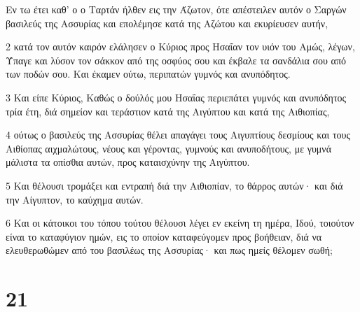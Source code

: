 \par Εν τω έτει καθ' ο ο Ταρτάν ήλθεν εις την Άζωτον, ότε απέστειλεν αυτόν ο Σαργών βασιλεύς της Ασσυρίας και επολέμησε κατά της Αζώτου και εκυρίευσεν αυτήν,
\par 2 κατά τον αυτόν καιρόν ελάλησεν ο Κύριος προς Ησαΐαν τον υιόν του Αμώς, λέγων, Ύπαγε και λύσον τον σάκκον από της οσφύος σου και έκβαλε τα σανδάλια σου από των ποδών σου. Και έκαμεν ούτω, περιπατών γυμνός και ανυπόδητος.
\par 3 Και είπε Κύριος, Καθώς ο δούλός μου Ησαΐας περιεπάτει γυμνός και ανυπόδητος τρία έτη, διά σημείον και τεράστιον κατά της Αιγύπτου και κατά της Αιθιοπίας,
\par 4 ούτως ο βασιλεύς της Ασσυρίας θέλει απαγάγει τους Αιγυπτίους δεσμίους και τους Αιθίοπας αιχμαλώτους, νέους και γέροντας, γυμνούς και ανυποδήτους, με γυμνά μάλιστα τα οπίσθια αυτών, προς καταισχύνην της Αιγύπτου.
\par 5 Και θέλουσι τρομάξει και εντραπή διά την Αιθιοπίαν, το θάρρος αυτών· και διά την Αίγυπτον, το καύχημα αυτών.
\par 6 Και οι κάτοικοι του τόπου τούτου θέλουσι λέγει εν εκείνη τη ημέρα, Ιδού, τοιούτον είναι το καταφύγιον ημών, εις το οποίον καταφεύγομεν προς βοήθειαν, διά να ελευθερωθώμεν από του βασιλέως της Ασσυρίας· και πως ημείς θέλομεν σωθή;

\chapter{21}

